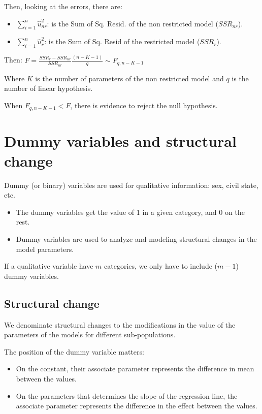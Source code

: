 \documentclass[10pt, a4paper, landscape]{extarticle}
\begin{document}
\begin{multicols}{3}
Then, looking at the errors, there are:

\begin{itemize}[leftmargin=*]
\item $\sum_{i=1}^n \hat{u}_{nr}^2$: is the Sum of Sq. Resid. of the non restricted model ($SSR_{nr}$).
\item $\sum_{i=1}^n \hat{u}_r^2$: is the Sum of Sq. Resid of the restricted model ($SSR_r$).
\end{itemize}

Then: $F = \frac{SSR_r - SSR_{nr}}{SSR_{nr}} \frac{(n-K-1)}{q} \sim F_{q, n-K-1}$

Where $K$ is the number of parameters of the non restricted model and $q$ is the number of linear hypothesis.

When $F_{q, n-K-1} < F$, there is evidence to reject the null hypothesis.

\section*{Dummy variables and structural change}

Dummy (or binary) variables are used for qualitative information: sex, civil state, etc.

\begin{itemize}[leftmargin=*]
\item The dummy variables get the value of 1 in a given category, and 0 on the rest.
\item Dummy variables are used to analyze and modeling structural changes in the model parameters.
\end{itemize}

If a qualitative variable have $m$ categories, we only have to include ($m-1$) dummy variables.

\subsection*{Structural change}

We denominate structural changes to the modifications in the value of the parameters of the models for different sub-populations.

The position of the dummy variable matters:
\begin{itemize}[leftmargin=*]
\item On the constant, their associate parameter represents the difference in mean between the values.
\item On the parameters that determines the slope of the regression line, the associate parameter represents the difference in the effect between the values.
\end{itemize}


\end{multicols}
\end{document}
